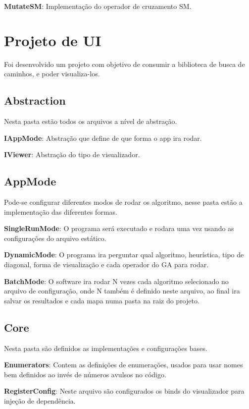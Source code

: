 \textbf{MutateSM}: Implementação do operador de cruzamento SM.


\section{Projeto de UI}

Foi desenvolvido um projeto com objetivo de consumir a biblioteca de busca de caminhos, e poder visualiza-los.

\subsection{Abstraction}

Nesta pasta estão todos os arquivos a nível de abstração.

\textbf{IAppMode}: Abstração que define de que forma o app ira rodar.

\textbf{IViewer}: Abstração do tipo de visualizador.

\subsection{AppMode}

Pode-se configurar diferentes modos de rodar os algoritmo, nesse pasta estão a implementação das diferentes formas.

\textbf{SingleRunMode}: O programa será executado e rodara uma vez usando as configurações do arquivo estático.

\textbf{DynamicMode}: O programa ira perguntar qual algoritmo, heurística, tipo de diagonal, forma de visualização e cada operador do GA para rodar.

\textbf{BatchMode}: O software ira rodar N vezes cada algoritmo selecionado no arquivo de configuração, onde N também é definido neste arquivo, ao final ira salvar os resultados e cada mapa numa pasta na raiz do projeto.


\subsection{Core}

Nesta pasta são definidos as implementações e configurações bases.

\textbf{Enumerators}: Contem as definições de enumerações, usados para usar nomes bem definidos ao invés de números avulsos no código.

\textbf{RegisterConfig}: Neste arquivo são configurados os binds do visualizador para injeção de dependência.

